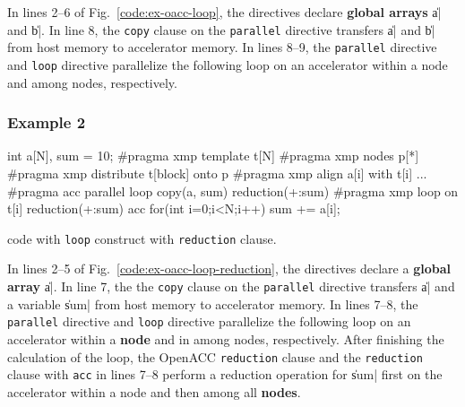 In lines 2--6 of Fig.~\ref{code:ex-oacc-loop},
the directives declare {\bf global arrays} \|a| and \|b|.
%
In line 8, the {\tt copy} clause on the {\tt parallel} directive
transfers \|a| and \|b| from host memory to accelerator memory.
%
In lines 8--9,
the {\tt parallel} directive and {\XMP} {\tt loop} directive
parallelize the following loop on an accelerator within
a node and among nodes, respectively.

\subsubsection*{Example 2}

\begin{myfigure}
\begin{center}
\begin{XACCCexampleL}
int a[N], sum = 10;
#pragma xmp template t[N]
#pragma xmp nodes p[*]
#pragma xmp distribute t[block] onto p
#pragma xmp align a[i] with t[i]
...
#pragma acc parallel loop copy(a, sum) reduction(+:sum)
#pragma xmp loop on t[i] reduction(+:sum) acc
for(int i=0;i<N;i++){
  sum += a[i];
}
\end{XACCCexampleL}
\end{center}
\caption{{\XACC} code with {\OACC} {\tt loop} construct
  with {\tt reduction} clause.}\label{code:ex-oacc-loop-reduction}
\end{myfigure}

In lines 2--5 of Fig.~\ref{code:ex-oacc-loop-reduction},
the directives declare a {\bf global array} \|a|.
%
In line 7,
the the {\tt copy} clause on the {\tt parallel} directive transfers \|a|
and a variable \|sum| from host memory to accelerator memory.
%
In lines 7--8,
the {\tt parallel} directive and {\XMP} {\tt loop} directive parallelize
the following loop on an accelerator within a {\bf node} and in among
nodes, respectively.
%
After finishing the calculation of the loop,
the OpenACC {\tt reduction} clause and the {\XMP} {\tt reduction} clause
with {\tt acc} in lines 7--8 perform a reduction operation for \|sum|
first on the accelerator within a node and then among all {\bf nodes}.



